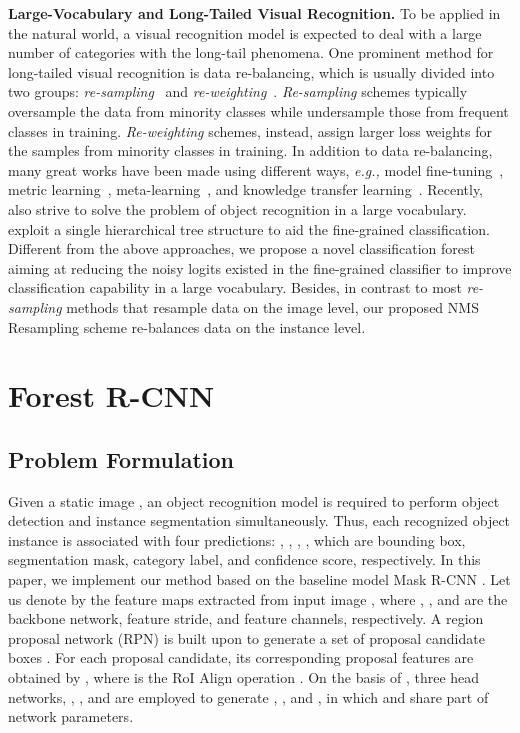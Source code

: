 \documentclass[sigconf]{acmart}
\newcommand{\myparagraph}[1]{{\vspace{0.5em} \noindent \bf #1}}
\begin{document}
\myparagraph{Large-Vocabulary and Long-Tailed Visual Recognition.} To be applied in the natural world, a visual recognition model is expected to deal with a large number of categories with the long-tail phenomena. One prominent method for long-tailed visual recognition is data re-balancing, which is usually divided into two groups: \emph{re-sampling}~\cite{cls_sample,resample2,resample4,lst,bbn} and \emph{re-weighting}~\cite{reweight1,cls_balance_loss,reweight3}. \emph{Re-sampling} schemes typically oversample the data from minority classes while undersample those from frequent classes in training. \emph{Re-weighting} schemes, instead, assign larger loss weights for the samples from minority classes in training. In addition to data re-balancing, many great works have been made using different ways, \emph{e.g.,} model fine-tuning~\cite{ouyang_cvpr16,reweight3}, metric learning~\cite{reweight1,zhang_iccv17}, meta-learning~\cite{liu_cvpr19}, and knowledge transfer learning~\cite{zhong_cvpr19}. Recently,~\cite{equalization_loss,ouyang_cvpr16,yolo9000,rfcn3000} also strive to solve the problem of object recognition in a large vocabulary.~\cite{ouyang_cvpr16,yolo9000,rfcn3000} exploit a single hierarchical tree structure to aid the fine-grained classification. Different from the above approaches, we propose a novel classification forest aiming at reducing the noisy logits existed in the fine-grained classifier to improve classification capability in a large vocabulary. Besides, in contrast to most \emph{re-sampling} methods that resample data on the image level, our proposed NMS Resampling scheme re-balances data on the instance level.



\section{Forest R-CNN}

\subsection{Problem Formulation}
\vspace{-1mm}
\label{subsec:problem_formulation}
Given a static image , an object recognition model is required to perform object detection and instance segmentation simultaneously. Thus, each recognized object instance is associated with four predictions: , , , , which are bounding box, segmentation mask, category label, and confidence score, respectively. In this paper, we implement our method based on the baseline model Mask R-CNN \cite{maskrcnn}. Let us denote by  the feature maps extracted from input image , where , , and  are the backbone network, feature stride, and feature channels, respectively. A region proposal network (RPN) \cite{faster_rcnn} is built upon  to generate a set of proposal candidate boxes . For each proposal candidate, its corresponding proposal features  are obtained by , where  is the RoI Align operation \cite{maskrcnn}. On the basis of , three head networks, , , and  are employed to generate , , and , in which  and  share part of network parameters. 
\end{document}

